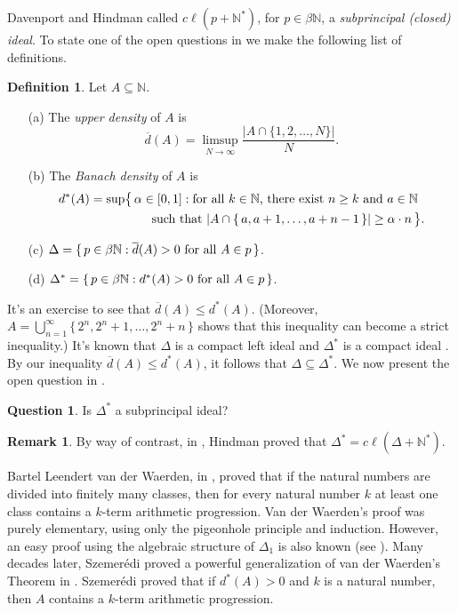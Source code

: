 \documentclass[12pt]{article}
\theoremstyle{plain}
\theoremstyle{definition}
\newtheorem{defn}[thm]{Definition}
\newtheorem{rmk}[thm]{Remark}
\newtheorem{ques}[thm]{Question}
\newcommand{\bbN}{\mathbb{N}}
\begin{document}
Davenport and Hindman called $c\ell(p+\bbN^*)$, for $p \in \beta\bbN$,
a \textsl{subprincipal (closed) ideal}.
To state one of the open questions in \cite{Davenport:1987uq} we make
the following list of definitions.
\begin{defn}
  Let $A \subseteq \bbN$.
  \begin{itemize}
    \item[(a)] The \textsl{upper density} of $A$ is 
      \[
        \overline{d}(A) = \limsup_{N\to\infty} \frac{|A \cap \{1, 2,
          \ldots, N\}|}{N}.
      \]
    \item[(b)] The \textsl{Banach density} of $A$ is 
      \begin{align*}
        d^*(A) &= \sup\bigl\{\, \alpha \in [0,1] : \hbox{for all $k \in
          \bbN$, there exist $n \ge k$ and $a \in \bbN$} \\
        &\hspace{5em}\hbox{such that $|A \cap \{\,a, a+1, \ldots,
          a+n-1\,\}| \ge \alpha\cdot n$} \,\bigr\}.
      \end{align*}

    \item[(c)] $\Delta = \{\, p \in \beta\bbN : \hbox{$\overline{d}(A)
        > 0$ for all $A \in p$} \,\}$.

    \item[(d)] $\Delta^* = \{\, p \in \beta\bbN : \hbox{$d^*(A) > 0$
        for all $A \in p$} \,\}$.
  \end{itemize}
\end{defn}
It's an exercise to see that $\overline{d}(A) \le d^*(A)$.
(Moreover, $A = \bigcup_{n=1}^\infty \{\,2^n, 2^n +1, \ldots, 2^n+n
\,\}$ shows that this inequality can become a strict inequality.)
It's known that $\Delta$ is a compact left ideal \cite[Theorem
6.79]{Hindman:1998fk} and $\Delta^*$ is a compact ideal \cite[Theorem
20.5]{Hindman:1998fk}.
By our inequality $\overline{d}(A) \le d^*(A)$, it follows that
$\Delta \subseteq \Delta^*$.
We now present the open question in \cite{Davenport:1987uq}.
\begin{ques}
  Is $\Delta^*$ a subprincipal ideal?
\end{ques}
\begin{rmk}
  By way of contrast, in \cite[Lemma 3.4]{Hindman:1988kx}, Hindman
  proved that $\Delta^* = c\ell(\Delta + \bbN^*)$.  
\end{rmk}

Bartel Leendert van der Waerden, in \cite{Van-der-Waerden:1927fk},
proved that if the natural numbers are divided into finitely many
classes, then for every natural number $k$ at least one class contains
a $k$-term arithmetic progression.
Van der Waerden's proof was purely elementary, using only the
pigeonhole principle and induction. 
However, an easy proof using the algebraic structure of $\Delta_1$ is
also known (see \cite[Theorem 14.1 and Corollary 14.2]{Hindman:1998fk}).
Many decades later, Szemer\'{e}di proved a powerful generalization of van
der Waerden's Theorem in \cite{Szemeredi:1975uq}.
Szemer\'{e}di proved that if $d^*(A) > 0$ and $k$ is a natural number,
then $A$ contains a $k$-term arithmetic progression.
\end{document}
